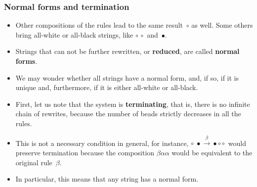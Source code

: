 \documentclass[compress,dvips,xcolor={dvipsnames},t]{beamer}
\begin{document}
\begin{frame}
  \frametitle{Normal forms and termination}

  \begin{itemize}

    \item Other compositions of the rules lead to the same
      result~\(\circ\) as well. Some others bring all\hyp{}white or
      all\hyp{}black strings, like \(\circ \, \circ\) and~\(\bullet\).

    \item Strings that can not be further rewritten, or
      \textbf{reduced}, are called \textbf{normal forms}.

    \item We may wonder whether all strings have a normal form, and,
      if so, if it is unique and, furthermore, if it is either
      all\hyp{}white or all\hyp{}black.

    \item First, let us note that the system is \textbf{terminating},
      that is, there is no infinite chain of rewrites, because the
      number of beads strictly decreases in all the rules.

    \item This is not a necessary condition in general, for instance,
      \(\circ \; \bullet \xrightarrow{\beta} \bullet \circ
      \circ\) would preserve termination because the composition
      \(\beta\alpha\alpha\) would be equivalent to the original
      rule~\(\beta\).

    \item In particular, this means that any string has a normal form.

  \end{itemize}
\end{frame}
\end{document}
